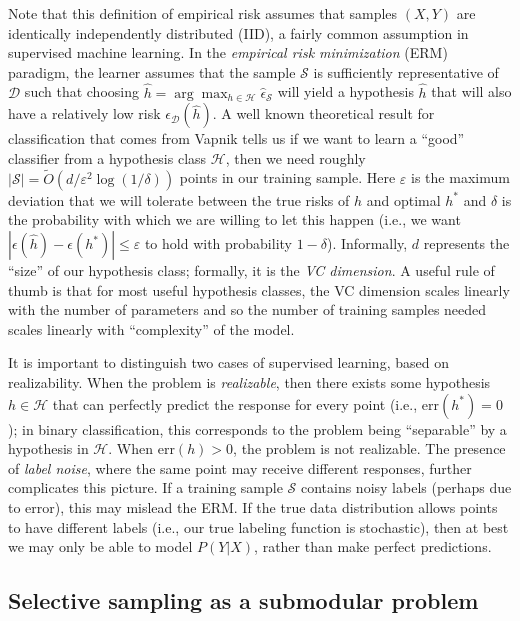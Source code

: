\noindent Note that this definition of empirical risk assumes that samples $(X, Y)$ are identically independently distributed (IID), a fairly common assumption in supervised machine learning. In the \textit{empirical risk minimization} (ERM) paradigm, the learner assumes that the sample $\mathcal{S}$ is sufficiently representative of $\mathcal{D}$ such that choosing $\hat{h} = \arg\max_{h \in \mathcal{H}} \hat{\epsilon}_{\mathcal{S}}$ will yield a hypothesis $\hat{h}$ that will also have a relatively low risk $\epsilon_{\mathcal{D}}(\hat{h})$. A well known theoretical result for classification that comes from Vapnik tells us if we want to learn a ``good'' classifier from a hypothesis class $\mathcal{H}$, then we need roughly $|\mathcal{S}| = \widetilde{O}\left(d/\varepsilon^2 \log (1/\delta)\right)$ points in our training sample. Here $\varepsilon$ is the maximum deviation that we will tolerate between the true risks of $\hat{h}$ and optimal $h^\ast$ and $\delta$ is the probability with which we are willing to let this happen (i.e., we want $|\epsilon(\hat{h}) - \epsilon(h^\ast)| \leq \varepsilon$ to hold with probability $1-\delta$). Informally, $d$ represents the ``size'' of our hypothesis class; formally, it is the \textit{VC dimension}. A useful rule of thumb is that for most useful hypothesis classes, the VC dimension scales linearly with the number of parameters and so the number of training samples needed scales linearly with ``complexity'' of the model.

It is important to distinguish two cases of supervised learning, based on realizability. When the problem is \textit{realizable}, then there exists some hypothesis $h \in \mathcal{H}$ that can perfectly predict the response for every point (i.e., $\mathrm{err}(h^\ast) = 0$); in binary classification, this corresponds to the problem being ``separable'' by a hypothesis in $\mathcal{H}$. When $\mathrm{err}(h) > 0$, the problem is not realizable. The presence of \textit{label noise}, where the same point may receive different responses, further complicates this picture. If a training sample $\mathcal{S}$ contains noisy labels (perhaps due to error), this may mislead the ERM. If the true data distribution allows points to have different labels (i.e., our true labeling function is stochastic), then at best we may only be able to model $P(Y|X)$, rather than make perfect predictions.

\subsection{Selective sampling as a submodular problem}

